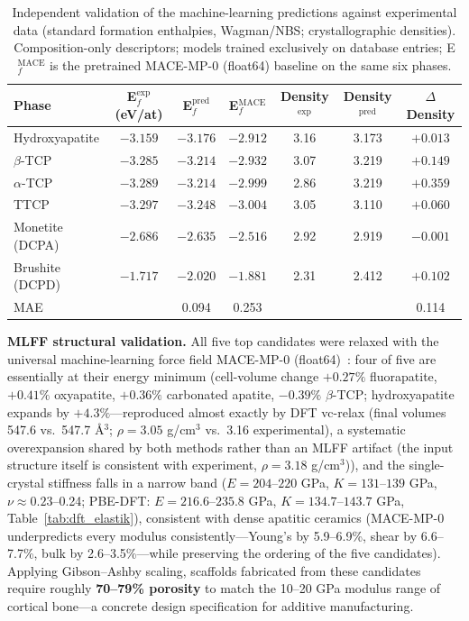 \documentclass[11pt,a4paper]{article}
\begin{document}
\begin{table}[ht]
\centering\small
\caption{Independent validation of the machine-learning predictions against experimental data (standard formation enthalpies, Wagman/NBS; crystallographic densities). Composition-only descriptors; models trained exclusively on database entries; E$_f^{\mathrm{MACE}}$ is the pretrained MACE-MP-0 (float64) baseline on the same six phases.}
\label{tab:bench}
\begin{tabular}{lcccccc}
\toprule
Phase & E$_f^{\mathrm{exp}}$ (eV/at) & E$_f^{\mathrm{pred}}$ & E$_f^{\mathrm{MACE}}$ & Density$^{\mathrm{exp}}$ & Density$^{\mathrm{pred}}$ & $\Delta$Density \\
\midrule
Hydroxyapatite & $-3.159$ & $-3.176$ & $-2.912$ & 3.16 & 3.173 & $+0.013$ \\
$\beta$-TCP & $-3.285$ & $-3.214$ & $-2.932$ & 3.07 & 3.219 & $+0.149$ \\
$\alpha$-TCP & $-3.289$ & $-3.214$ & $-2.999$ & 2.86 & 3.219 & $+0.359$ \\
TTCP & $-3.297$ & $-3.248$ & $-3.004$ & 3.05 & 3.110 & $+0.060$ \\
Monetite (DCPA) & $-2.686$ & $-2.635$ & $-2.516$ & 2.92 & 2.919 & $-0.001$ \\
Brushite (DCPD) & $-1.717$ & $-2.020$ & $-1.881$ & 2.31 & 2.412 & $+0.102$ \\
\midrule
MAE & & 0.094 & 0.253 & & & 0.114 \\
\bottomrule
\end{tabular}
\end{table}

\textbf{MLFF structural validation.} All five top candidates were relaxed with the universal machine-learning force field MACE-MP-0 (float64)~\cite{batatia2022}: four of five are essentially at their energy minimum (cell-volume change $+0.27\%$ fluorapatite, $+0.41\%$ oxyapatite, $+0.36\%$ carbonated apatite, $-0.39\%$ $\beta$-TCP; hydroxyapatite expands by $+4.3\%$---reproduced almost exactly by DFT vc-relax (final volumes 547.6 vs.\ 547.7 \AA$^3$; $\rho = 3.05$ g/cm$^3$ vs.\ 3.16 experimental), a systematic overexpansion shared by both methods rather than an MLFF artifact (the input structure itself is consistent with experiment, $\rho = 3.18$ g/cm$^3$)), and the single-crystal stiffness falls in a narrow band ($E = 204$--$220$ GPa, $K = 131$--$139$ GPa, $\nu \approx 0.23$--0.24; PBE-DFT: $E = 216.6$--$235.8$ GPa, $K = 134.7$--$143.7$ GPa, Table~\ref{tab:dft_elastik}), consistent with dense apatitic ceramics (MACE-MP-0 underpredicts every modulus consistently---Young's by 5.9--6.9\%, shear by 6.6--7.7\%, bulk by 2.6--3.5\%---while preserving the ordering of the five candidates). Applying Gibson--Ashby scaling, scaffolds fabricated from these candidates require roughly \textbf{70--79\% porosity} to match the 10--20 GPa modulus range of cortical bone---a concrete design specification for additive manufacturing.
\end{document}
